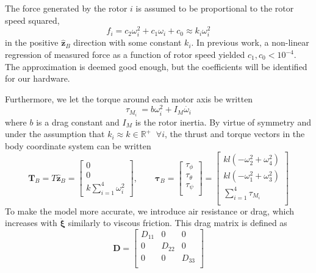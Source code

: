 \documentclass{article}
\begin{document}
The force generated by the rotor $i$ is assumed to be proportional to the rotor speed squared,
\begin{equation}
f_i = c_2 \omega_i^2 + c_1 \omega_i + c_0 \approx k_i\omega_i^2
\end{equation}
in the positive $\hat{\mathbf{z}}_B$ direction with some constant $k_i$. In previous work, a non-linear regression of measured force as a function of rotor speed yielded $c_1,c_0 < 10^{-4}$. The approximation is deemed good enough, but the coefficients will be identified for our hardware.

Furthermore, we let the torque around each motor axis be written
\begin{equation}
\tau_{M_i}\ = b\omega_i^2+I_M\dot{\omega_i}
\end{equation}
where $b$ is a drag constant and $I_M$ is the rotor inertia. By virtue of symmetry and under the assumption that $k_i\approx k \in \mathbb{R}^+\;\;\forall i$, the thrust and torque vectors in the body coordinate system can be written
\begin{equation}\label{eq:torque}
\mathbf{T}_{B} =
T \hat{\mathbf{z}}_B= 
\begin{bmatrix}
0\\
0\\
 k\sum\limits_{i = 1}^4\omega_i^2
\end{bmatrix}
, \qquad
\boldsymbol{\tau}_B = 
\begin{bmatrix}
\tau_{\phi}\\
\tau_{\theta}\\
\tau_{\psi}\\
\end{bmatrix}
=
\begin{bmatrix}
kl(-\omega_2^2 + \omega_4^2)\\
kl(-\omega_1^2 + \omega_3^2)\\
\sum\limits_{i = 1}^4\tau_{M_i}\\
\end{bmatrix}
\end{equation}
To make the model more accurate, we introduce air resistance or drag, which increases with $\dot{\boldsymbol{\xi}}$ similarly to viscous friction. This drag matrix is defined as
\begin{equation}
\mathbf{D} =
\begin{bmatrix} D_{11} & 0 & 0\\ 0 & D_{22} & 0\\ 0 & 0 & D_{33}\\\end{bmatrix}
\end{equation}
\end{document}
